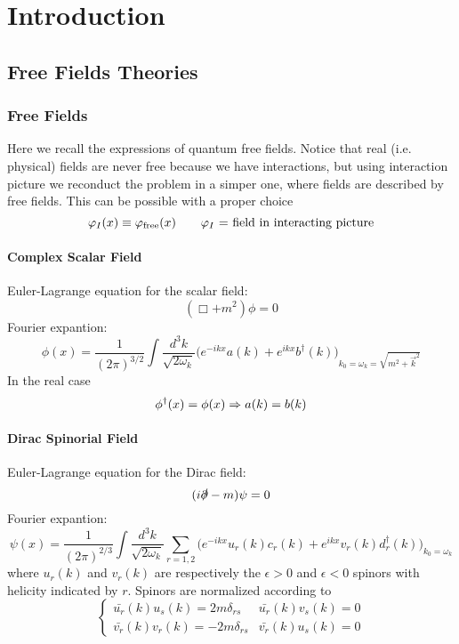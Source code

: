 \documentclass[TheoreticalPhy_ModB.tex]{subfiles}
\begin{document}
\chapter{Introduction}

\section{Free Fields Theories}
\subsection{Free Fields}
Here we recall the expressions of quantum  free fields.
Notice that real (i.e. physical) fields are never free because we have interactions, but using interaction picture we reconduct the problem in a simper one, where fields are described by free fields. This can be possible with a proper choice
\[
\varphi_I (x) \equiv \varphi_{\textup{free}}(x) \qquad \varphi_I \text{ = field in interacting picture}
\]

\subsubsection{Complex Scalar Field}

Euler-Lagrange equation for the scalar field:
\[(\Box + m^2) \phi = 0\]
Fourier expantion:
\[
\phi(x) = \frac{1}{(2 \pi)^{3/2}} \int \frac{d^3 k}{\sqrt{2 \omega_k}} \bigl( e^{-ikx} a(k) + e^{ikx} b^{\dagger}(k) \bigr)_{k_0 = \omega_k=\sqrt{m^2 + \vec{k}^2}} 
\]
In the real case 
\[\phi^{\dagger}(x) = \phi(x) \Rightarrow a(k) = b(k)\]

\subsubsection{Dirac Spinorial Field}
Euler-Lagrange equation for the Dirac field:
\[(i \slashed{\partial} - m) \psi = 0\]
Fourier expantion:
\[
\psi(x) = \frac{1}{(2 \pi)^{2/3}} \int \frac{d^3 k}{\sqrt{2 \omega_k}} \sum_{r=1,2} \bigl( e^{-ikx} u_r (k) c_r(k) + e^{ikx} v_r(k) d^{\dagger}_r(k) \bigr)_{k_0 = \omega_k} 
\]
where $u_r(k)$ and $v_r(k)$ are respectively the $\epsilon > 0$ and $\epsilon <0$ spinors with helicity indicated by $r$.
Spinors are normalized according to
\[
\begin{cases}
\bar{u_r}(k) u_s(k) = 2m \delta_{rs}	& \bar{u_r}(k) v_s(k) = 0 \\
\bar{v_r}(k) v_r(k) = -2m \delta_{rs} 	& \bar{v_r}(k)u_s(k) = 0
\end{cases}
\]
\end{document}
